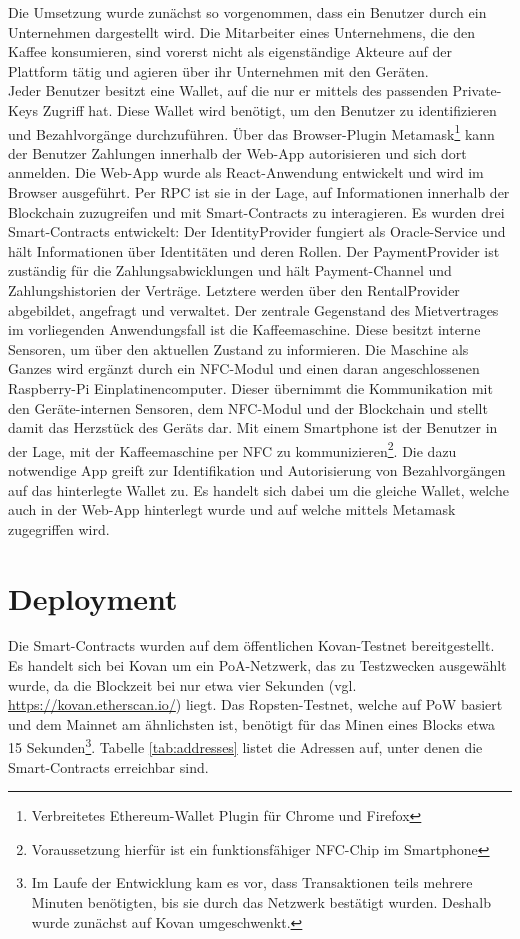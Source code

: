 Die Umsetzung wurde zunächst so vorgenommen, dass ein Benutzer durch ein Unternehmen dargestellt wird. Die Mitarbeiter eines Unternehmens, die den Kaffee konsumieren, sind vorerst nicht als eigenständige Akteure auf der Plattform tätig und agieren über ihr Unternehmen mit den Geräten.\\
Jeder Benutzer besitzt eine Wallet, auf die nur er mittels des passenden Private-Keys Zugriff hat. Diese Wallet wird benötigt, um den Benutzer zu identifizieren und Bezahlvorgänge durchzuführen. Über das Browser-Plugin Metamask\footnote{Verbreitetes Ethereum-Wallet Plugin für Chrome und Firefox} kann der Benutzer Zahlungen innerhalb der Web-App autorisieren und sich dort anmelden. Die Web-App wurde als React-Anwendung entwickelt und wird im Browser ausgeführt. Per \ac{RPC} ist sie in der Lage, auf Informationen innerhalb der Blockchain zuzugreifen und mit Smart-Contracts zu interagieren. Es wurden drei Smart-Contracts entwickelt: Der IdentityProvider fungiert als Oracle-Service und hält Informationen über Identitäten und deren Rollen. Der PaymentProvider ist zuständig für die Zahlungsabwicklungen und hält Payment-Channel und Zahlungshistorien der Verträge. Letztere werden über den RentalProvider abgebildet, angefragt und verwaltet. Der zentrale Gegenstand des Mietvertrages im vorliegenden Anwendungsfall ist die Kaffeemaschine. Diese besitzt interne Sensoren, um über den aktuellen Zustand zu informieren. Die Maschine als Ganzes wird ergänzt durch ein \ac{NFC}-Modul und einen daran angeschlossenen Raspberry-Pi Einplatinencomputer. Dieser übernimmt die Kommunikation mit den Geräte-internen Sensoren, dem \ac{NFC}-Modul und der Blockchain und stellt damit das Herzstück des Geräts dar. Mit einem Smartphone ist der Benutzer in der Lage, mit der Kaffeemaschine per \ac{NFC} zu kommunizieren\footnote{Voraussetzung hierfür ist ein funktionsfähiger \ac{NFC}-Chip im Smartphone}. Die dazu notwendige App greift zur Identifikation und Autorisierung von Bezahlvorgängen auf das hinterlegte Wallet zu. Es handelt sich dabei um die gleiche Wallet, welche auch in der Web-App hinterlegt wurde und auf welche mittels Metamask zugegriffen wird.

\section{Deployment}
\label{sec:implementation:poc:deployment}
Die Smart-Contracts wurden auf dem öffentlichen Kovan-Testnet bereitgestellt. Es handelt sich bei Kovan um ein \ac{PoA}-Netzwerk, das zu Testzwecken ausgewählt wurde, da die Blockzeit bei nur etwa vier Sekunden (vgl. \url{https://kovan.etherscan.io/}) liegt. Das Ropsten-Testnet, welche auf \ac{PoW} basiert und dem Mainnet am ähnlichsten ist, benötigt für das Minen eines Blocks etwa 15 Sekunden\footnote{Im Laufe der Entwicklung kam es vor, dass Transaktionen teils mehrere Minuten benötigten, bis sie durch das Netzwerk bestätigt wurden. Deshalb wurde zunächst auf Kovan umgeschwenkt.}. Tabelle \ref{tab:addresses} listet die Adressen auf, unter denen die Smart-Contracts erreichbar sind.

